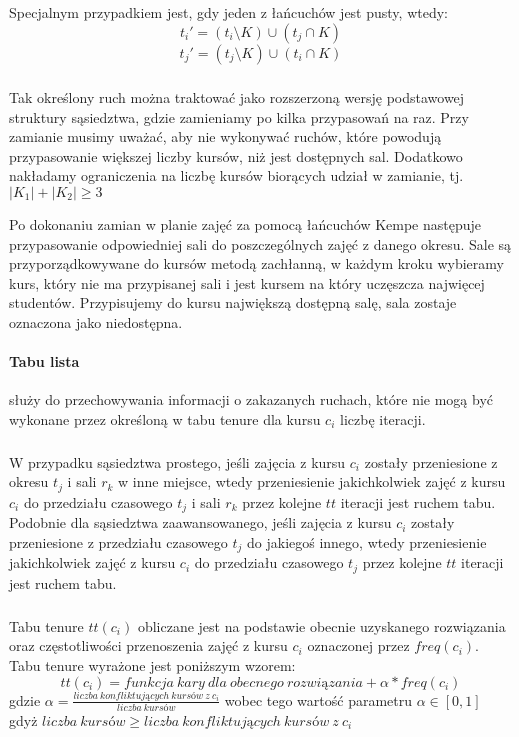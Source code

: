 \begin{enumerate}
Specjalnym przypadkiem jest, gdy jeden z łańcuchów jest pusty, wtedy:
\[ t_i' = (t_i \setminus K) \cup (t_j \cap K)\]
\[ t_j' = (t_j \setminus K) \cup (t_i \cap K)\]

\subparagraph{}Tak określony ruch można traktować jako rozszerzoną wersję podstawowej struktury sąsiedztwa, gdzie zamieniamy po kilka przypasowań na raz. Przy zamianie musimy uważać, aby nie wykonywać ruchów, które powodują przypasowanie większej liczby kursów, niż jest dostępnych sal. Dodatkowo nakładamy ograniczenia na liczbę kursów biorących udział w zamianie, tj. $|K_1|+ |K_2| \geq 3 $

\par Po dokonaniu zamian w planie zajęć za pomocą łańcuchów Kempe następuje przypasowanie odpowiedniej sali do poszczególnych zajęć z danego okresu. Sale są przyporządkowywane do kursów metodą zachłanną, w każdym kroku wybieramy kurs, który nie ma przypisanej sali i jest kursem na który uczęszcza najwięcej studentów. Przypisujemy do kursu największą dostępną salę, sala zostaje oznaczona jako niedostępna.

\end{enumerate}
\paragraph{Tabu lista}
służy do przechowywania informacji o zakazanych ruchach, które nie mogą być wykonane przez określoną w tabu tenure dla kursu $c_{i}$ liczbę iteracji.
\subparagraph{}W przypadku sąsiedztwa prostego, jeśli zajęcia z kursu $c_i$ zostały przeniesione z okresu $t_j$ i sali $r_k$ w inne miejsce, wtedy przeniesienie jakichkolwiek zajęć z kursu $c_i$ do przedziału czasowego $t_j$ i sali $r_k$ przez kolejne $tt$ iteracji jest ruchem tabu. Podobnie dla sąsiedztwa zaawansowanego, jeśli zajęcia z kursu $c_i$ zostały przeniesione z przedziału czasowego $t_j$ do jakiegoś innego, wtedy przeniesienie jakichkolwiek zajęć z kursu $c_i$ do przedziału czasowego $t_j$ przez kolejne $tt$ iteracji jest ruchem tabu.
\subparagraph{}
Tabu tenure $tt(c_{i})$ obliczane jest na podstawie obecnie uzyskanego rozwiązania oraz częstotliwości przenoszenia zajęć z kursu $c_{i}$ oznaczonej przez $freq(c_{i})$. \\
Tabu tenure wyrażone jest poniższym wzorem: 
 \[tt(c_{i}) = funkcja\ kary\ dla\ obecnego\ rozwiązania + \alpha * freq(c_{i}) \] 
gdzie ${\alpha = \frac{liczba\ konfliktujących\ kursów\ z\ c_{i}}{liczba\ kursów}}$ wobec tego wartość parametru ${\alpha \in [0, 1]}$ \\
gdyż ${liczba\ kursów \geq liczba\ konfliktujących\ kursów\ z\ c_{i}} $

